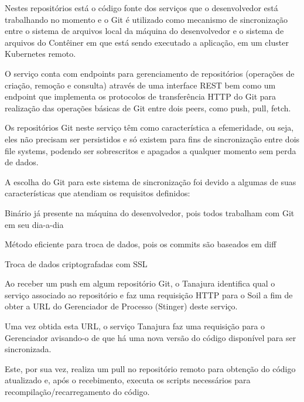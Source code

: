 \documentclass[]{politex}
\begin{document}
	Nestes repositórios está o código fonte dos serviços que o desenvolvedor está trabalhando no momento e o Git é utilizado como mecanismo de sincronização entre o sistema de arquivos local da máquina do desenvolvedor e o sistema de arquivos do Contêiner em que está sendo executado a aplicação, em um cluster Kubernetes remoto.
	
	O serviço conta com endpoints para gerenciamento de repositórios (operações de criação, remoção e consulta) através de uma interface REST bem como um endpoint que implementa os protocolos de transferência HTTP do Git para realização das operações básicas de Git entre dois peers, como push, pull, fetch.
	
	Os repositórios Git neste serviço têm como característica a efemeridade, ou seja, eles não precisam ser persistidos e só existem para fins de sincronização entre dois file systems, podendo ser sobrescritos e apagados a qualquer momento sem perda de dados.
	
	A escolha do Git para este sistema de sincronização foi devido a algumas de suas características que atendiam os requisitos definidos:
	
	Binário já presente na máquina do desenvolvedor, pois todos trabalham com Git em seu dia-a-dia
	
	Método eficiente para troca de dados, pois os commits são baseados em diff
	
	Troca de dados criptografadas com SSL

	Ao receber um push em algum repositório Git, o Tanajura identifica qual o serviço associado ao repositório e faz uma requisição HTTP para o Soil a fim de obter a URL do Gerenciador de Processo (Stinger) deste serviço.
	
	Uma vez obtida esta URL, o serviço Tanajura faz uma requisição para o Gerenciador avisando-o de que há uma nova versão do código disponível para ser sincronizada.
	
	Este, por sua vez, realiza um pull no repositório remoto para obtenção do código atualizado e, após o recebimento, executa os scripts necessários para recompilação/recarregamento do código.
	
\end{document}
